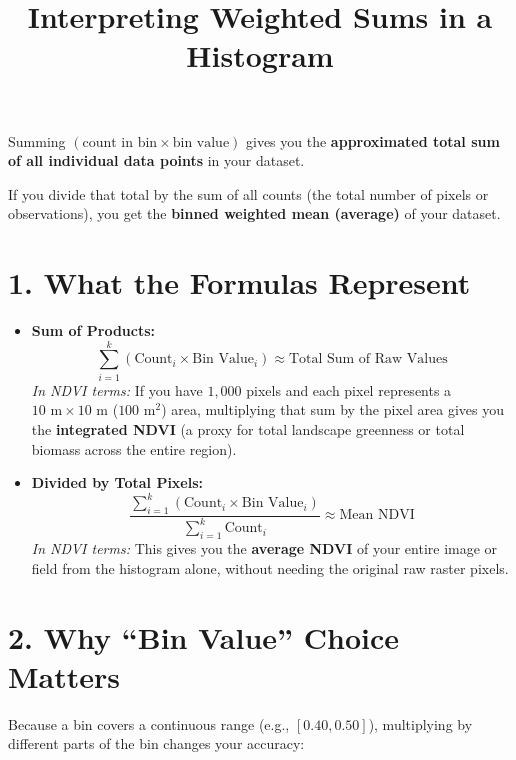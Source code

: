 \documentclass[11pt,a4paper]{article}
\title{Interpreting Weighted Sums in a Histogram}
\author{}
\date{}
\begin{document}
\maketitle

Summing $(\text{count in bin} \times \text{bin value})$ gives you the \textbf{approximated total sum of all individual data points} in your dataset.

If you divide that total by the sum of all counts (the total number of pixels or observations), you get the \textbf{binned weighted mean (average)} of your dataset.

\section*{1. What the Formulas Represent}

\begin{itemize}[leftmargin=1.5em]
    \item \textbf{Sum of Products:}
    \begin{equation}
        \sum_{i=1}^{k} \left(\text{Count}_i \times \text{Bin Value}_i\right) \approx \text{Total Sum of Raw Values}
    \end{equation}
    \textit{In NDVI terms:} If you have $1{,}000$ pixels and each pixel represents a $10\text{ m} \times 10\text{ m}$ ($100\text{ m}^2$) area, multiplying that sum by the pixel area gives you the \textbf{integrated NDVI} (a proxy for total landscape greenness or total biomass across the entire region).

    \item \textbf{Divided by Total Pixels:}
    \begin{equation}
        \frac{\sum_{i=1}^{k} \left(\text{Count}_i \times \text{Bin Value}_i\right)}{\sum_{i=1}^{k} \text{Count}_i} \approx \text{Mean NDVI}
    \end{equation}
    \textit{In NDVI terms:} This gives you the \textbf{average NDVI} of your entire image or field from the histogram alone, without needing the original raw raster pixels.
\end{itemize}

\section*{2. Why ``Bin Value'' Choice Matters}

Because a bin covers a continuous range (e.g., $[0.40, 0.50]$), multiplying by different parts of the bin changes your accuracy:
\end{document}
